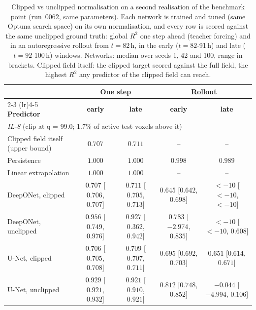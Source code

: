 \begin{table}[!htbp]
\caption{Clipped vs unclipped normalisation on a second realisation of the benchmark point (run~0062, same parameters). Each network is trained and tuned (same Optuna search space) on its own normalisation, and every row is scored against the same unclipped ground truth: global $R^2$ one step ahead (teacher forcing) and in an autoregressive rollout from $t=82$\,h, in the early ($t=82$-91\,h) and late ($t=92$-100\,h) windows. Networks: median over seeds 1, 42 and 100, range in brackets. Clipped field itself: the clipped target scored against the full field, the highest $R^2$ any predictor of the clipped field can reach.}
\label{tab:clip_comparison}
\centering\footnotesize
\begin{tabular}{lcccc}
\toprule
& \multicolumn{2}{c}{\textbf{One step}} & \multicolumn{2}{c}{\textbf{Rollout}} \\
\cmidrule(lr){2-3} \cmidrule(lr){4-5}
\textbf{Predictor} & \textbf{early} & \textbf{late} & \textbf{early} & \textbf{late} \\
\midrule
\multicolumn{5}{l}{\textit{IL-8} (clip at q = 99.0; 1.7\% of active test voxels above it)} \\
Clipped field itself (upper bound) & $0.707$ & $0.711$ & -- & -- \\
Persistence & $1.000$ & $1.000$ & $0.998$ & $0.989$ \\
Linear extrapolation & $1.000$ & $1.000$ & -- & -- \\
DeepONet, clipped & $0.707$ [$0.706$, $0.707$] & $0.711$ [$0.705$, $0.713$] & $0.645$ [$0.642$, $0.698$] & $<-10$ [$<-10$, $<-10$] \\
DeepONet, unclipped & $0.956$ [$0.749$, $0.976$] & $0.927$ [$0.362$, $0.942$] & $0.783$ [$-2.974$, $0.835$] & $<-10$ [$<-10$, $0.608$] \\
U-Net, clipped & $0.706$ [$0.705$, $0.708$] & $0.709$ [$0.707$, $0.711$] & $0.695$ [$0.692$, $0.703$] & $0.651$ [$0.614$, $0.671$] \\
U-Net, unclipped & $0.929$ [$0.921$, $0.932$] & $0.921$ [$0.910$, $0.921$] & $0.812$ [$0.748$, $0.852$] & $-0.044$ [$-4.994$, $0.106$] \\
\bottomrule
\end{tabular}
\end{table}

